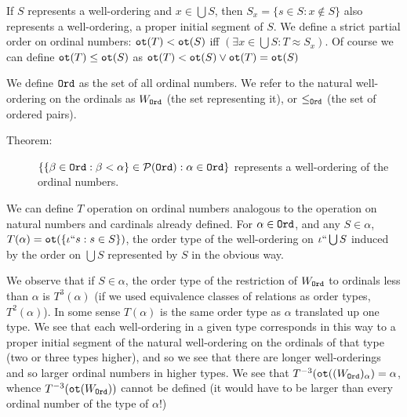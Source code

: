 \documentclass[12pt]{article}
\begin{document}
If $S$ represents a well-ordering and $x \in \bigcup S$, then $S_x = \{s \in S:x \not\in S\}$ also represents a well-ordering, a proper initial segment of $S$.  We define
a strict partial order on ordinal numbers:  ${\tt ot}(T) < {\tt ot}(S)$ iff $(\exists x \in \bigcup S:T \approx S_x)$.  Of course we can define ${\tt ot}(T) \leq {\tt ot}(S)$ as
${\tt ot}(T) <  {\tt ot}(S) \vee {\tt ot}(T) = {\tt ot}(S)$

We define ${\tt Ord}$ as the set of all ordinal numbers.  We refer to the natural well-ordering on the ordinals as $W_{\tt Ord}$ (the set representing it), or $\leq_{\tt Ord}$ (the set of ordered pairs).

\begin{description}

\item[Theorem:]  $\{\{\beta \in {\tt Ord}:\beta < \alpha\} \in {\cal P}({\tt Ord}):\alpha \in {\tt Ord}\}$ represents a well-ordering of the ordinal numbers.

\end{description}

We can define  $T$ operation on ordinal numbers analogous to the operation on natural numbers and cardinals already defined.  For $\alpha \in {\tt Ord}$, and any $S \in \alpha$,
$T(\alpha) = {\tt ot}(\{\iota``s:s \in S\})$, the order type of the well-ordering on $\iota``\bigcup S$ induced by the order on $\bigcup S$ represented by $S$ in the obvious way.

We observe that if $S \in \alpha$, the order type of the restriction of $W_{\tt Ord}$ to ordinals less than $\alpha$ is $T^3(\alpha)$ (if we used equivalence classes of relations as order types, $T^2(\alpha)$).  In some sense $T(\alpha)$ is the same order type as $\alpha$ translated up one type.  We see that each well-ordering in a given type corresponds in this way to a proper initial segment of the natural well-ordering on the ordinals of that type (two or three types higher), and so we see that there are longer well-orderings and so larger ordinal numbers in higher types.   We see that $T^{-3}({\tt ot}((W_{\tt Ord})_\alpha) = \alpha$, whence $T^{-3}({\tt ot}(W_{\tt Ord}))$ cannot be defined (it would have to be larger than every ordinal number of the type of $\alpha$!)
\end{document}
